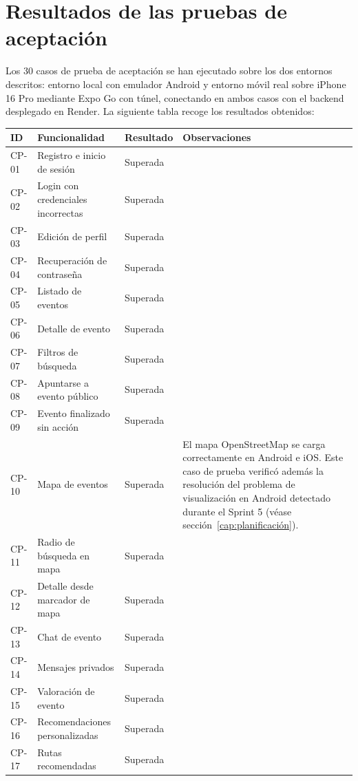 \section{Resultados de las pruebas de aceptación}

Los 30 casos de prueba de aceptación se han ejecutado sobre los dos entornos descritos: entorno local con emulador Android y entorno móvil real sobre iPhone 16 Pro mediante Expo Go con túnel, conectando en ambos casos con el backend desplegado en Render. La siguiente tabla recoge los resultados obtenidos:

\begin{longtable}{|p{1.3cm}|p{4.5cm}|p{2.8cm}|p{6cm}|}
\hline
\textbf{ID} & \textbf{Funcionalidad} & \textbf{Resultado} & \textbf{Observaciones} \\
\hline
CP-01 & Registro e inicio de sesión & Superada & \\
\hline
CP-02 & Login con credenciales incorrectas & Superada & \\
\hline
CP-03 & Edición de perfil & Superada & \\
\hline
CP-04 & Recuperación de contraseña & Superada & \\
\hline
CP-05 & Listado de eventos & Superada & \\
\hline
CP-06 & Detalle de evento & Superada & \\
\hline
CP-07 & Filtros de búsqueda & Superada & \\
\hline
CP-08 & Apuntarse a evento público & Superada & \\
\hline
CP-09 & Evento finalizado sin acción & Superada & \\
\hline
CP-10 & Mapa de eventos & Superada & El mapa OpenStreetMap se carga correctamente en Android e iOS. Este caso de prueba verificó además la resolución del problema de visualización en Android detectado durante el Sprint 5 (véase sección~\ref{cap:planificación}). \\
\hline
CP-11 & Radio de búsqueda en mapa & Superada & \\
\hline
CP-12 & Detalle desde marcador de mapa & Superada & \\
\hline
CP-13 & Chat de evento & Superada & \\
\hline
CP-14 & Mensajes privados & Superada & \\
\hline
CP-15 & Valoración de evento & Superada & \\
\hline
CP-16 & Recomendaciones personalizadas & Superada & \\
\hline
CP-17 & Rutas recomendadas & Superada & \\

\end{longtable}
